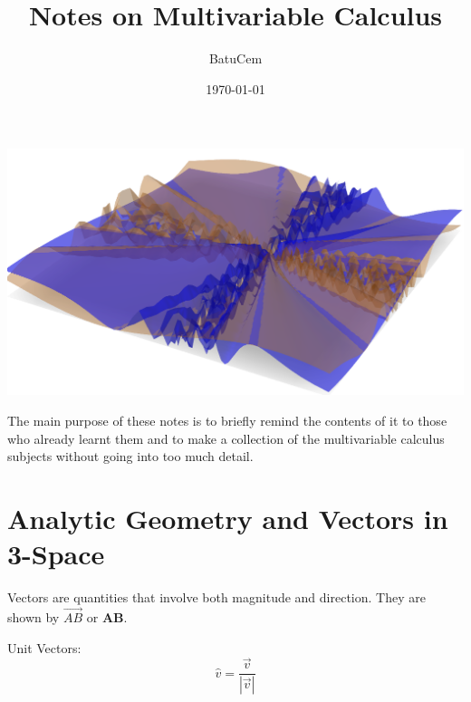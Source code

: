 \documentclass[12pt]{article}
\begin{document}
\title{Notes on Multivariable Calculus}
\author{BatuCem}
\date{\today}
\maketitle
\includegraphics[scale=0.5]{C.png}

\begin{small}
The main purpose of these notes is to briefly remind the contents of it to those who already learnt them and to make a collection of the multivariable calculus subjects without going into too much detail.
\end{small}
\newpage
\tableofcontents
\newpage
\section{Analytic Geometry and Vectors in 3-Space}
Vectors are quantities that involve both magnitude and direction. They are shown by $\overrightarrow{AB}$ or \textbf{AB}.

Unit Vectors: $$\hat{v}=\frac{\vec v}{|\vec v|}$$
\end{document}
